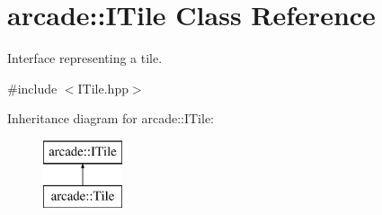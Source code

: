 \hypertarget{classarcade_1_1_i_tile}{}\section{arcade\+:\+:I\+Tile Class Reference}
\label{classarcade_1_1_i_tile}


Interface representing a tile.  




{\ttfamily \#include $<$I\+Tile.\+hpp$>$}

Inheritance diagram for arcade\+:\+:I\+Tile\+:\begin{figure}[H]
\begin{center}
\leavevmode
\includegraphics[height=2.000000cm]{classarcade_1_1_i_tile}
\end{center}
\end{figure}
